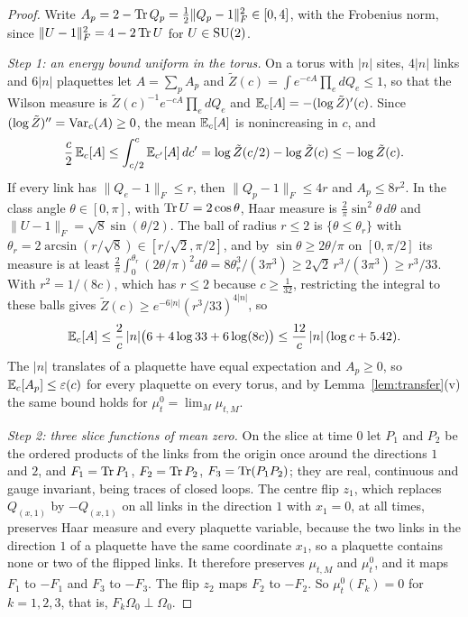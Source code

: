 \begin{proof}
Write $A_p=2-\operatorname{Tr} Q_p=\frac12\|Q_p-1\|_F^2\in[0,4]$, with the Frobenius norm,
since $\|U-1\|_F^2=4-2\operatorname{Tr} U$ for $U\in\mathrm{SU}(2)$.

\emph{Step 1: an energy bound uniform in the torus.} On a torus with $|n|$
sites, $4|n|$ links and $6|n|$ plaquettes let $A=\sum_pA_p$ and $\tilde Z(c)=
\int e^{-cA}\prod_edQ_e\le1$, so that the Wilson measure is $\tilde Z(c)^{-1}
e^{-cA}\prod_edQ_e$ and $\mathbb{E}_c[A]=-(\log\tilde Z)'(c)$. Since $(\log\tilde
Z)''=\operatorname{Var}_c(A)\ge0$, the mean $\mathbb{E}_c[A]$ is nonincreasing in $c$, and
\[
\frac c2\,\mathbb{E}_c[A]\le\int_{c/2}^c\mathbb{E}_{c'}[A]\,dc'=\log\tilde Z(c/2)-\log\tilde
Z(c)\le-\log\tilde Z(c).
\]
If every link has $\|Q_e-1\|_F\le r$, then $\|Q_p-1\|_F\le4r$ and $A_p\le8r^2$.
In the class angle $\theta\in[0,\pi]$, with $\operatorname{Tr} U=2\cos\theta$, Haar
measure is $\frac2\pi\sin^2\theta\,d\theta$ and $\|U-1\|_F=\sqrt8\sin(\theta/
2)$. The ball of radius $r\le2$ is $\{\theta\le\theta_r\}$ with $\theta_r=2
\arcsin(r/\sqrt8)\in[r/\sqrt2,\pi/2]$, and by $\sin\theta\ge2\theta/\pi$ on
$[0,\pi/2]$ its measure is at least $\frac2\pi\int_0^{\theta_r}(2\theta/\pi)^2
d\theta=8\theta_r^3/(3\pi^3)\ge2\sqrt2\,r^3/(3\pi^3)\ge r^3/33$. With $r^2=1/
(8c)$, which has $r\le2$ because $c\ge\frac1{32}$, restricting the integral
to these balls gives $\tilde Z(c)\ge e^{-6|n|}(r^3/33)^{4|n|}$, so
\[
\mathbb{E}_c[A]\le\frac2c\,|n|\bigl(6+4\log33+6\log(8c)\bigr)\le\frac{12}c\,|n|\,
(\log c+5.42).
\]
The $|n|$ translates of a plaquette have equal expectation and $A_p\ge0$,
so $\mathbb{E}_c[A_p]\le\varepsilon(c)$ for every plaquette on every torus, and by
Lemma~\ref{lem:transfer}(v) the same bound holds for $\mu^0_t=\lim_M\mu_{t,M}$.

\emph{Step 2: three slice functions of mean zero.} On the slice at time $0$
let $P_1$ and $P_2$ be the ordered products of the links from the origin
once around the directions $1$ and $2$, and $F_1=\operatorname{Tr} P_1$, $F_2=\operatorname{Tr} P_2$,
$F_3=\operatorname{Tr}(P_1P_2)$; they are real, continuous and gauge invariant, being
traces of closed loops. The centre flip $z_1$, which replaces $Q_{(x,1)}$ by
$-Q_{(x,1)}$ on all links in the direction $1$ with $x_1=0$, at all times,
preserves Haar measure and every plaquette variable, because the two links
in the direction $1$ of a plaquette have the same coordinate $x_1$, so a
plaquette contains none or two of the flipped links. It therefore preserves
$\mu_{t,M}$ and $\mu^0_t$, and it maps $F_1$ to $-F_1$ and $F_3$ to $-F_3$.
The flip $z_2$ maps $F_2$ to $-F_2$. So $\mu^0_t(F_k)=0$ for $k=1,2,3$, that
is, $F_k\Omega_0\perp\Omega_0$.


\end{proof}
